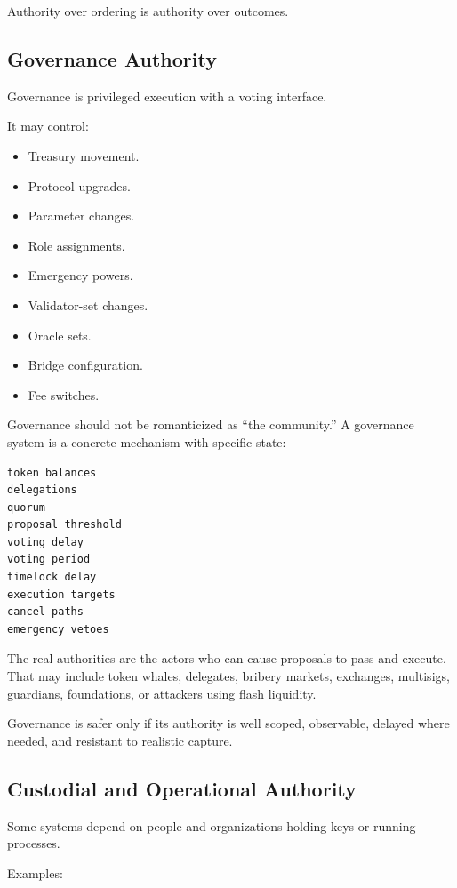 Authority over ordering is authority over outcomes.

\subsection{Governance Authority}

Governance is privileged execution with a voting interface.

It may control:

\begin{itemize}
\tightlist
\item
  Treasury movement.
\item
  Protocol upgrades.
\item
  Parameter changes.
\item
  Role assignments.
\item
  Emergency powers.
\item
  Validator-set changes.
\item
  Oracle sets.
\item
  Bridge configuration.
\item
  Fee switches.
\end{itemize}

Governance should not be romanticized as ``the community.'' A governance
system is a concrete mechanism with specific state:

\begin{lstlisting}
token balances
delegations
quorum
proposal threshold
voting delay
voting period
timelock delay
execution targets
cancel paths
emergency vetoes
\end{lstlisting}

The real authorities are the actors who can cause proposals to pass and
execute. That may include token whales, delegates, bribery markets,
exchanges, multisigs, guardians, foundations, or attackers using flash
liquidity.

Governance is safer only if its authority is well scoped, observable,
delayed where needed, and resistant to realistic capture.

\subsection{Custodial and Operational Authority}

Some systems depend on people and organizations holding keys or running
processes.

Examples:


